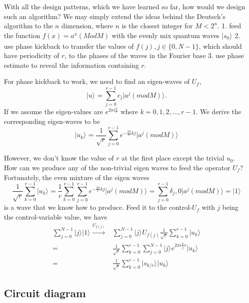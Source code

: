 \documentclass{book}
\newcommand{\keta}[2][]{\vert {#2} \rangle_{#1}}
\begin{document}
With all the design patterns, which we have learned so far, how would we design such an algorithm? We may simply extend the ideas behind the Deutsch's algorithm to the $n$ dimension, where $n$ is the closest integer for $M < 2^n$.
1. feed the function $f(x) = a^x (Mod M)$ with the evenly mix quantum waves $\keta{s_0}$
2. use phase kickback to transfer the values of $f(j), j\in \{0,N-1\}$, which should have periodicity of $r$, to the phases of the waves in the Fourier base
3. use phase estimate to reveal the information containing $r$.

For phase kickback to work, we need to find an eigen-waves of $U_f$,
\begin{equation}\label{keta_u}
    \keta{u} = \sum^{r-1}_{j=0} c_j \keta{a^j (mod M)}.
\end{equation}
If we assume the eigen-values are $e^{2\pi i \frac k r}$ where $k=0, 1, 2, ..., r-1$. We derive the corresponding eigen-waves to be
\begin{equation}\label{keta_u}
    \keta{u_k} = \frac 1 {\sqrt{r}} \sum^{r-1}_{j=0} e^{-{\frac {2\pi} r} kj} \keta{a^j (mod M)}
\end{equation}

However, we don't know the value of $r$ at the first place except the trivial $u_0$. How can we produce any of the non-trivial eigen waves to feed the operator $U_f$? Fortunately, the even mixture of the eigen waves
\begin{equation}\label{sum_u}
    \frac 1 {\sqrt{r}} \sum^{r-1}_{k=0}\keta{u_k} = \frac 1 r \sum^{r-1}_{k=0} \sum^{r-1}_{j=0} e^{-{\frac {2\pi} r} kj} \keta{a^j (mod M)} = \sum^{r-1}_{j=0} \delta_j,0 \keta{a^j (mod M)} = \keta{1}
\end{equation}
is a wave that we know how to produce. Feed it to the control-$U_f$ with $j$ being the control-variable value, we have
\begin{equation}\label{ctrl_u}
\begin{array}{rl}
 \sum^{N-1}_{j=0} \keta{j} \keta{1} \xrightarrow{U_{f(j)}} & \sum^{N-1}_{j=0} \keta{j} U_{f(j)} \frac 1 {\sqrt{r}} \sum^{r-1}_{k=0}\keta{u_k}\\
    = & \frac 1 {\sqrt{r}} \sum^{r-1}_{k=0} \sum^{N-1}_{j=0} \keta{j} e^{2\pi i \frac kj r} \keta{u_k}\\
    = & \frac 1 {\sqrt{r}} \sum^{r-1}_{k=0} \keta{s_{k/r}} \keta{u_k}
\end{array}
\end{equation}

\subsection{Circuit diagram}
\end{document}
